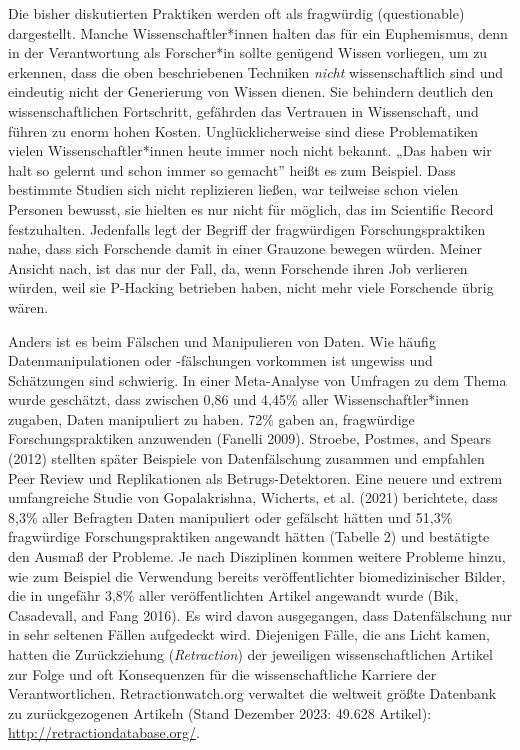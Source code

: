 \documentclass[
  letterpaper,
  DIV=11,
  numbers=noendperiod]{scrreprt}
\begin{document}
Die bisher diskutierten Praktiken werden oft als fragwürdig
(questionable) dargestellt. Manche Wissenschaftler*innen halten das für
ein Euphemismus, denn in der Verantwortung als Forscher*in sollte
genügend Wissen vorliegen, um zu erkennen, dass die oben beschriebenen
Techniken \emph{nicht} wissenschaftlich sind und eindeutig nicht der
Generierung von Wissen dienen. Sie behindern deutlich den
wissenschaftlichen Fortschritt, gefährden das Vertrauen in Wissenschaft,
und führen zu enorm hohen Kosten. Unglücklicherweise sind diese
Problematiken vielen Wissenschaftler*innen heute immer noch nicht
bekannt. „Das haben wir halt so gelernt und schon immer so gemacht''
heißt es zum Beispiel. Dass bestimmte Studien sich nicht replizieren
ließen, war teilweise schon vielen Personen bewusst, sie hielten es nur
nicht für möglich, das im Scientific Record festzuhalten. Jedenfalls
legt der Begriff der fragwürdigen Forschungspraktiken nahe, dass sich
Forschende damit in einer Grauzone bewegen würden. Meiner Ansicht nach,
ist das nur der Fall, da, wenn Forschende ihren Job verlieren würden,
weil sie P-Hacking betrieben haben, nicht mehr viele Forschende übrig
wären.

Anders ist es beim Fälschen und Manipulieren von Daten. Wie häufig
Datenmanipulationen oder -fälschungen vorkommen ist ungewiss und
Schätzungen sind schwierig. In einer Meta-Analyse von Umfragen zu dem
Thema wurde geschätzt, dass zwischen 0,86 und 4,45\% aller
Wissenschaftler*innen zugaben, Daten manipuliert zu haben. 72\% gaben
an, fragwürdige Forschungspraktiken anzuwenden (Fanelli 2009). Stroebe,
Postmes, and Spears (2012) stellten später Beispiele von Datenfälschung
zusammen und empfahlen Peer Review und Replikationen als
Betrugs-Detektoren. Eine neuere und extrem umfangreiche Studie von
Gopalakrishna, Wicherts, et al. (2021) berichtete, dass 8,3\% aller
Befragten Daten manipuliert oder gefälscht hätten und 51,3\% fragwürdige
Forschungspraktiken angewandt hätten (Tabelle 2) und bestätigte den
Ausmaß der Probleme. Je nach Disziplinen kommen weitere Probleme hinzu,
wie zum Beispiel die Verwendung bereits veröffentlichter
biomedizinischer Bilder, die in ungefähr 3,8\% aller veröffentlichten
Artikel angewandt wurde (Bik, Casadevall, and Fang 2016). Es wird davon
ausgegangen, dass Datenfälschung nur in sehr seltenen Fällen aufgedeckt
wird. Diejenigen Fälle, die ans Licht kamen, hatten die Zurückziehung
(\emph{Retraction}) der jeweiligen wissenschaftlichen Artikel zur Folge
und oft Konsequenzen für die wissenschaftliche Karriere der
Verantwortlichen. Retractionwatch.org verwaltet die weltweit größte
Datenbank zu zurückgezogenen Artikeln (Stand Dezember 2023: 49.628
Artikel): \url{http://retractiondatabase.org/}.
\end{document}
